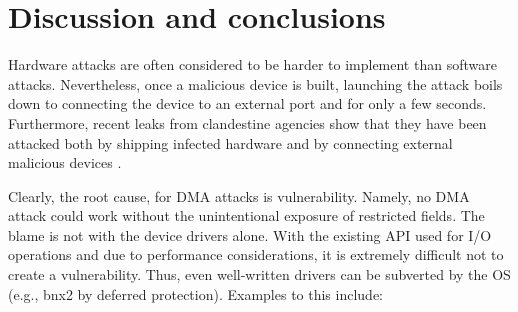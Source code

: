

\section{Discussion and conclusions}

Hardware attacks are often considered to be harder to implement than software attacks. Nevertheless, once a malicious device is built, launching the attack boils down to connecting the device to an external port and for only a few seconds. Furthermore, recent leaks from clandestine agencies show that they have been attacked both by shipping infected hardware \cite{Gal14} and by connecting external malicious devices \cite{Fin14}. 

\begin{comment}
\footnote{\url{https://lore.kernel.org/lkml/20180510230948.GF190385@bhelgaas-glaptop.roam.corp.google.com/}}.
\end{comment}

Clearly, the root cause, for DMA attacks is \subpage{} vulnerability. Namely, no DMA attack could work without the unintentional exposure of restricted fields. The blame is not with the device drivers alone. With the existing API used for I/O operations and due to performance considerations, it is extremely difficult not to create a \subpage{} vulnerability. Thus, even well-written drivers can be subverted by the OS (e.g., bnx2 by deferred protection). Examples to this include:

